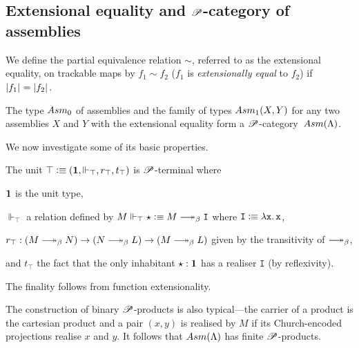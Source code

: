 \documentclass[draft,a4paper,UKenglish,numberwithinsect,cleveref,thm-restate]{lipics-v2021}
\numberwithin{equation}{section}
\theoremstyle{definition}
\theoremstyle{plain}
\begin{document}



\subsection{Extensional equality and \texorpdfstring{$\mathscr{P}$}{P}-category of assemblies}

We define the partial equivalence relation $\sim$, referred to as the extensional equality, on trackable maps by $f_1 \sim f_2$ ($f_1$ is \emph{extensionally equal} to $f_2$) if $\mathopen{}\left|f_1\right|_{}^{}\mathclose{} = \mathopen{}\left|f_2\right|_{}^{}\mathclose{}$.
\begin{proposition}
  The type $\Asm_0$ of assemblies and the family of types $\Asm_1(X, Y)$ for any two assemblies $X$ and $Y$ with the extensional equality form a $\mathscr{P}$-category~$\Asm(\Lambda)$.
\end{proposition}

We now investigate some of its basic properties.
\begin{example}
  The unit $\top \vcentcolon\equiv (\mathbf{1}, \Vdash_\top, r_\top, t_\top)$ is $\mathscr{P}$-terminal where 
  \begin{romanenumerate}
    \item $\mathbf{1}$ is the unit type,  
    \item $\Vdash_\top$ a relation defined by $M \Vdash_\top \star \defeq M \reduce \mathtt{I}$ where $\mathtt{I} \vcentcolon\equiv \mathtt{\lambda x.\, x}$, 
    \item $r_\top : (M \reduce N) \to (N \reduce L) \to (M \reduce L)$ given by the transitivity of $\reduce$,
    \item and $t_\top$ the fact that the only inhabitant $\star : \mathbf{1}$ has a realiser $\mathtt{I}$ (by reflexivity).
  \end{romanenumerate}
  The finality follows from function extensionality.
\end{example}
The construction of binary $\mathscr{P}$-products is also typical---the carrier of a product is the cartesian product and a pair $(x, y)$ is realised by $M$ if its Church-encoded projections realise $x$ and $y$.
It follows that $\Asm(\Lambda)$ has finite $\mathscr{P}$-products.
\end{document}
